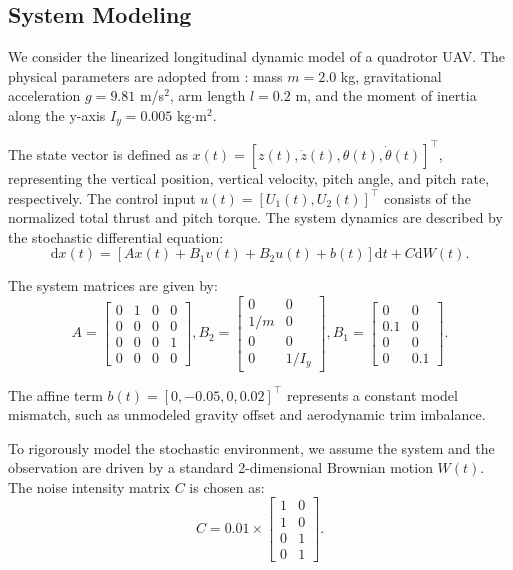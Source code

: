 \documentclass[lettersize,journal]{IEEEtran}
\theoremstyle{plain}
\theoremstyle{definition}
\begin{document}
\subsection{System Modeling}
We consider the linearized longitudinal dynamic model of a quadrotor UAV. The physical parameters are adopted from \cite{Shi2018}: mass $m=2.0$ kg, gravitational acceleration $g=9.81$ m/s$^2$, arm length $l=0.2$ m, and the moment of inertia along the y-axis $I_y=0.005$ kg$\cdot$m$^2$.

The state vector is defined as $x(t) = [z(t), \dot{z}(t), \theta(t), \dot{\theta}(t)]^\top$, representing the vertical position, vertical velocity, pitch angle, and pitch rate, respectively. The control input $u(t) = [U_1(t), U_2(t)]^\top$ consists of the normalized total thrust and pitch torque. The system dynamics are described by the stochastic differential equation:
\begin{equation*}
	\mathrm{d}x(t) = [A x(t) + B_1 v(t) + B_2 u(t) + b(t)] \mathrm{d}t + C \mathrm{d}W(t).
\end{equation*}

The system matrices are given by:
\begin{equation*}
	A = \begin{bmatrix} 
		0 & 1 & 0 & 0 \\
		0 & 0 & 0 & 0 \\
		0 & 0 & 0 & 1 \\
		0 & 0 & 0 & 0 
	\end{bmatrix}, 
	B_2 = \begin{bmatrix} 
		0 & 0 \\
		1/m & 0 \\
		0 & 0 \\
		0 & 1/I_y
	\end{bmatrix}, 
	B_1 = \begin{bmatrix} 
		0 & 0 \\
		0.1 & 0 \\
		0 & 0 \\
		0 & 0.1 
	\end{bmatrix}.
\end{equation*}

The affine term $b(t) = [0, -0.05, 0, 0.02]^\top$ represents a constant model mismatch, such as unmodeled gravity offset and aerodynamic trim imbalance.

To rigorously model the stochastic environment, we assume the system and the observation are driven by a standard 2-dimensional Brownian motion $W(t)$. The noise intensity matrix $C$ is chosen as:
\begin{equation*}
	C = 0.01 \times \begin{bmatrix} 
		1 & 0 \\ 1 & 0 \\ 0 & 1 \\ 0 & 1 
	\end{bmatrix}.
\end{equation*}
\end{document}
